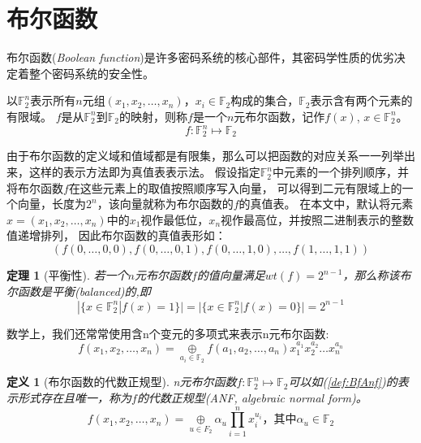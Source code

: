 \documentclass{xduugthesis}
\numberwithin{equation}{section}
\newtheorem{definition}{定义}
\begin{document}
\section{布尔函数}

布尔函数(\emph{Boolean function})是许多密码系统的核心部件，其密码学性质的优劣决定着整个密码系统的安全性。\par
以$\mathbb{F}_2^n$表示所有$n$元组$(x_1, x_2, \dots ,x_n)$，$x_i\in \mathbb{F}_2$构成的集合，$\mathbb{F}_2$表示含有两个元素的有限域。
$f$是从$\mathbb{F}_2^n$到$\mathbb{F}_2$的映射，则称$f$是一个$n$元布尔函数，记作$f(x)$, $x\in \mathbb{F}_2^n$。
$$
    f: \mathbb{F}_2^n \mapsto \mathbb{F}_2
$$

由于布尔函数的定义域和值域都是有限集，那么可以把函数的对应关系一一列举出来，这样的表示方法即为真值表表示法。
假设指定$\mathbb{F}_2^n$中元素的一个排列顺序，并将布尔函数$f$在这些元素上的取值按照顺序写入向量，
可以得到二元有限域上的一个向量，长度为$2^n$，该向量就称为布尔函数的$f$的真值表。
在本文中，默认将元素$x=(x_1, x_2, \dots , x_n)$中的$x_1$视作最低位，$x_n$视作最高位，并按照二进制表示的整数值递增排列，
因此布尔函数的真值表形如：
$$
    (f(0,\dots ,0,0), f(0,\dots ,0,1), f(0,\dots ,1,0),\dots ,f(1,\dots ,1,1))
$$\par

\newtheorem{mytheorem}{定理}[section]
\begin{mytheorem}[平衡性]\label{thm:balance}
    若一个$n$元布尔函数$f$的值向量满足$wt(f)=2^{n-1}$，那么称该布尔函数是平衡(\emph{balanced})的,即
    \begin{equation}
        |\{x\in \mathbb{F}_2^n |f(x)=1 \}| = |\{x\in \mathbb{F}_2^n |f(x)=0 \}| = 2^{n-1} 
    \end{equation}\par
\end{mytheorem}\par

数学上，我们还常常使用含n个变元的多项式来表示n元布尔函数:
\begin{equation}
    f(x_1,x_2,\dots ,x_n) = \mathop{\oplus}\limits_{a_i \in \mathbb{F}_2}f(a_1,a_2,\dots,a_n)x_1^{a_1}x_2^{a_2}\dots x_n^{a_n}
\end{equation}\par

\begin{definition}[布尔函数的代数正规型]
n元布尔函数$f:\mathbb{F}_2^n \mapsto \mathbb{F}_2$可以如(\ref{def:BfAnf})的表示形式存在且唯一，称为$f$的代数正规型(ANF, algebraic normal form)。
\begin{equation}
f(x_1,x_2,\dots ,x_n) = \mathop{\oplus}\limits_{u \in F_2}\alpha_u \prod\limits_{i=1}^n x_i^{u_i}\mbox{，其中}\alpha_u \in \mathbb{F}_2 \label{def:BfAnf}
\end{equation}
\end{definition}\par
\end{document}
